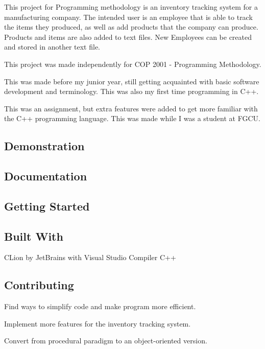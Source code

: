 
\begin{DoxyItemize}
\item This project for Programming methodology is an inventory tracking system for a manufacturing company. The intended user is an employee that is able to track the items they produced, as well as add products that the company can produce. Products and items are also added to text files. New Employees can be created and stored in another text file.
\item This project was made independently for C\+OP 2001 -\/ Programming Methodology.
\item This was made before my junior year, still getting acquainted with basic software development and terminology. This was also my first time programming in C++.
\item This was an assignment, but extra features were added to get more familiar with the C++ programming language. This was made while I was a student at F\+G\+CU.
\end{DoxyItemize}

\subsection*{Demonstration}



\subsection*{Documentation}

\subsection*{Getting Started}

\subsection*{Built With}

C\+Lion by Jet\+Brains with Visual Studio Compiler C++ \subsection*{Contributing}


\begin{DoxyItemize}
\item Find ways to simplify code and make program more efficient.
\item Implement more features for the inventory tracking system.
\item Convert from procedural paradigm to an object-\/oriented version.
\end{DoxyItemize}

